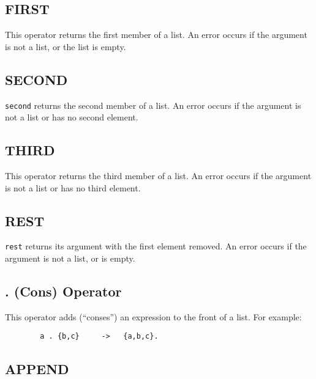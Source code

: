 \subsection{FIRST}
\hypertarget{operator:FIRST}{}

This operator returns the first member of a list.  An error
occurs if the argument is not a list, or the list is empty.

\subsection{SECOND}
\hypertarget{operator:SECOND}{}

\texttt{second} returns the second member of a list.  An error
occurs if the argument is not a list or has no second element.

\subsection{THIRD}
\hypertarget{operator:THIRD}{}

This operator returns the third member of a list.  An error
occurs if the argument is not a list or has no third element.

\subsection{REST}
\hypertarget{operator:REST}{}

\texttt{rest} returns its argument with the first element
removed.  An error occurs if the argument is not a list, or is empty.

\subsection{\textbf{.} (Cons) Operator}
\hypertarget{operator:CONS}{}
\hypertarget{reserved:consop}{}

This operator adds (``conses'') an expression to the
front of a list.  For example:
\begin{verbatim}
        a . {b,c}     ->   {a,b,c}.
\end{verbatim}

\subsection{APPEND}
\hypertarget{operator:APPEND}{}

